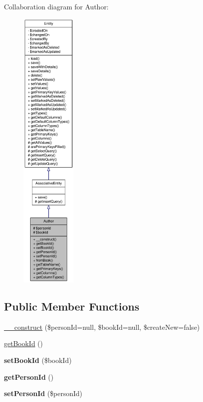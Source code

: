 Collaboration diagram for Author:\nopagebreak
\begin{figure}[H]
\begin{center}
\leavevmode
\includegraphics[height=400pt]{classAuthor__coll__graph}
\end{center}
\end{figure}
\subsection*{Public Member Functions}
\begin{DoxyCompactItemize}
\item 
\hyperlink{classAuthor_ad0dc0fef1570b45b600c990053adeb36}{\_\-\_\-construct} (\$personId=null, \$bookId=null, \$createNew=false)
\item 
\hyperlink{classAuthor_a5f4d6e520feb52f072417b1ae445eabc}{getBookId} ()
\item 
\hypertarget{classAuthor_af40db8767cf8f9ad7d30e9d5191e9f28}{
{\bfseries setBookId} (\$bookId)}
\label{classAuthor_af40db8767cf8f9ad7d30e9d5191e9f28}

\item 
\hypertarget{classAuthor_ae2af2c34ad093a8f53e9171f07c7323d}{
{\bfseries getPersonId} ()}
\label{classAuthor_ae2af2c34ad093a8f53e9171f07c7323d}

\item 
\hypertarget{classAuthor_a39f0c9e0946425c62dba102e2aaacebc}{
{\bfseries setPersonId} (\$personId)}
\label{classAuthor_a39f0c9e0946425c62dba102e2aaacebc}

\end{DoxyCompactItemize}
